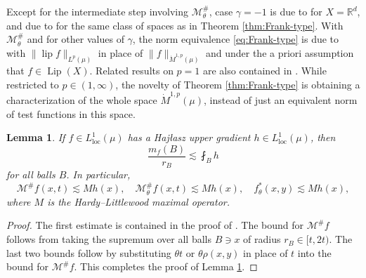 \documentclass[11pt]{amsart}
\newtheorem{lemma}[theorem]{Lemma}
\theoremstyle{definition}
\theoremstyle{remark}
\numberwithin{equation}{section}
\newcommand{\Norm}[2]{\|#1\|_{#2}}
\begin{document}
Except for the intermediate step involving $\mathcal M_{\theta}^{\#}$, case $\gamma=-1$ is
due to \cite{Frank:W1p} for $X=\mathbb R^d$, and due to \cite{HK:W1p} for the same class of
spaces as in Theorem \ref{thm:Frank-type}. With $\mathcal M_{\theta}^{\#}$ and for other
values of $\gamma$, the norm equivalence \eqref{eq:Frank-type} is due to \cite[Theorem 1.12
and Corollary 1.13]{DLYYZ} with $\Norm{\operatorname{lip}f}{L^p(\mu)}$ in place of
$\Norm{f}{\dot M^{1,p}(\mu)}$ and under the
a priori assumption that $f\in\operatorname{Lip}(X)$. Related results on $p=1$ are also
contained in \cite{DLYYZ}. While restricted to $p\in(1,\infty)$, the novelty of Theorem
\ref{thm:Frank-type} is obtaining a characterization of the whole space $\dot M^{1,p}(\mu)$,
instead of just an equivalent norm of test functions in this space.

\begin{lemma}\label{lem:Msharpf<Mh}
If $f\in L^1_{\mathrm{loc}}(\mu)$ has a Haj\l{}asz upper gradient $h\in
L^1_{\mathrm{loc}}(\mu)$, then
\begin{equation*}
   \frac{m_f(B)}{r_B}\lesssim\fint_B h
\end{equation*}
for all balls $B$. In particular,
\begin{equation*}
  \mathcal M^{\#}f(x,t)\lesssim Mh(x),\quad
  \mathcal M^{\#}_\theta f(x,t)\lesssim Mh(x),\quad
  f^*_\theta (x,y)\lesssim Mh(x),
\end{equation*}
where $M$ is the Hardy--Littlewood maximal operator.
\end{lemma}

\begin{proof}
The first estimate is contained in the proof of \cite[Proposition 5.1]{HK:W1p}.
The bound for $\mathcal M^{\#}f$ follows from taking the supremum over all balls $B\owns x$
of radius $r_B\in[t,2t)$. The last two bounds follow by substituting $\theta t$ or
$\theta\rho(x,y)$ in place of $t$ into the bound for $\mathcal M^{\#}f$.
This completes the proof of Lemma \ref{lem:Msharpf<Mh}.
\end{proof}
\end{document}
